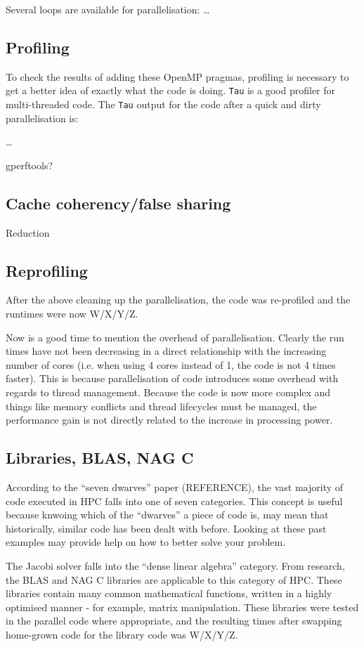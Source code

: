 \documentclass{article}
\begin{document}
Several loops are available for parallelisation: \ldots

\subsection{Profiling}
To check the results of adding these OpenMP pragmas, profiling is
necessary to get a better idea of exactly what the code is
doing. \texttt{Tau} is a good profiler for multi-threaded code. The
\texttt{Tau} output for the code after a quick and dirty
parallelisation is:

\ldots

gperftools?

\subsection{Cache coherency/false sharing}
Reduction

\subsection{Reprofiling}
After the above cleaning up the parallelisation, the code was
re-profiled and the runtimes were now W/X/Y/Z.

Now is a good time to mention the overhead of parallelisation. Clearly
the run times have not been decreasing in a direct relationship with
the increasing number of cores (i.e. when using 4 cores instead of 1,
the code is not 4 times faster). This is because parallelisation of
code introduces some overhead with regards to thread
management. Because the code is now more complex and things like
memory conflicts and thread lifecycles must be managed, the
performance gain is not directly related to the increase in processing power.

\subsection{Libraries, BLAS, NAG C}
According to the ``seven dwarves'' paper (REFERENCE), the vast
majority of code executed in HPC falls into one of seven
categories. This concept is useful because knwoing which of the
``dwarves'' a piece of code is, may mean that historically, similar
code has been dealt with before. Looking at these past examples may
provide help on how to better solve your problem.

The Jacobi solver falls into the ``dense linear algebra''
category. From research, the BLAS and NAG C libraries are applicable
to this category of HPC. These libraries contain many common mathematical
functions, written in a highly optimised manner - for example, matrix
manipulation. These libraries were tested in the parallel code where
appropriate, and the resulting times after swapping home-grown code
for the library code was W/X/Y/Z.
\end{document}
